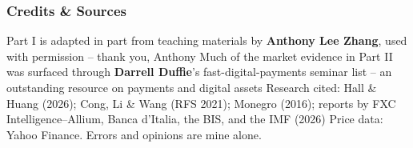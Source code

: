 \documentclass[aspectratio=169]{beamer}
\begin{document}
\begin{frame}
\frametitle{Credits \& Sources}

\bi
\m Part I is adapted in part from teaching materials by \textbf{Anthony Lee Zhang}, used with permission -- thank you, Anthony
\m Much of the market evidence in Part II was surfaced through \textbf{Darrell Duffie}'s fast-digital-payments seminar list -- an outstanding resource on payments and digital assets
\m Research cited: Hall \& Huang (2026); Cong, Li \& Wang (RFS 2021); Monegro (2016); reports by FXC Intelligence--Allium, Banca d'Italia, the BIS, and the IMF (2026)
\m Price data: Yahoo Finance. Errors and opinions are mine alone.
\ei

\end{frame}






\end{document}
